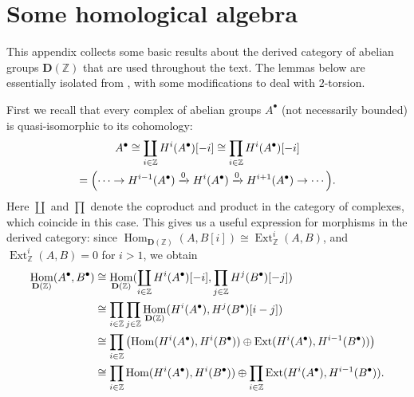 \documentclass[leqno,12pt]{article}
\theoremstyle{plain}
\theoremstyle{definition}
\DeclareMathOperator{\Hom}{Hom}
\DeclareMathOperator{\Ext}{Ext}
\newcommand{\ZZ}{\mathbb{Z}}
\newcommand{\DZ}{{\mathbf{D} (\ZZ)}}
\begin{document}

\pagebreak
\appendix
\section{Some homological algebra}
\label{app:homological-algebra}

This appendix collects some basic results about the derived category of abelian
groups $\DZ$ that are used throughout the text. The lemmas below
are essentially isolated from \cite{Flach-Morin-2018}, with some modifications
to deal with $2$-torsion.

First we recall that every complex of abelian groups $A^\bullet$ (not
necessarily bounded) is quasi-isomorphic to its cohomology:
\begin{multline*}
  A^\bullet \cong \coprod_{i\in \ZZ} H^i (A^\bullet) [-i] \cong
  \prod_{i\in \ZZ} H^i (A^\bullet) [-i] \\
  = \Bigl(\cdots \to H^{i-1} (A^\bullet) \xrightarrow{0} H^i (A^\bullet)
  \xrightarrow{0} H^{i+1} (A^\bullet) \to \cdots\Bigr).
\end{multline*}
Here $\coprod$ and $\prod$ denote the coproduct and product in the category of
complexes, which coincide in this case. This gives us a useful expression for
morphisms in the derived category: since
$\Hom_\DZ (A,B [i]) \cong \Ext_\ZZ^i (A,B)$, and $\Ext_\ZZ^i (A,B) = 0$ for $i > 1$, we obtain
\begin{align}
  \notag \Hom_\DZ (A^\bullet, B^\bullet) & \cong \Hom_\DZ (\coprod_{i\in\ZZ} H^i (A^\bullet) [-i], \prod_{j\in\ZZ} H^j (B^\bullet) [-j]) \\
  \notag & \cong \prod_{i\in \ZZ} \prod_{j\in \ZZ} \Hom_\DZ (H^i (A^\bullet), H^j (B^\bullet) [i-j]) \\
  \notag & \cong \prod_{i\in \ZZ} \left(\Hom (H^i (A^\bullet), H^i (B^\bullet)) \oplus \Ext (H^i (A^\bullet), H^{i-1} (B^\bullet))\right) \\
           \label{eqn:morphisms-in-D(Z)} & \cong \prod_{i\in \ZZ} \Hom (H^i (A^\bullet), H^i (B^\bullet)) \oplus \prod_{i\in \ZZ} \Ext (H^i (A^\bullet), H^{i-1} (B^\bullet)).
\end{align}
\end{document}
